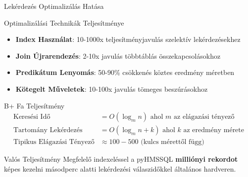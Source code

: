 \documentclass[aspectratio=169]{beamer}
\begin{document}
\begin{frame}{Lekérdezés Optimalizálás Hatása}
\begin{block}{Optimalizálási Technikák Teljesítménye}
\begin{itemize}
    \item \textbf{Index Használat}: 10-1000x teljesítményjavulás szelektív lekérdezésekhez
    \item \textbf{Join Újrarendezés}: 2-10x javulás többtáblás összekapcsolásokhoz
    \item \textbf{Predikátum Lenyomás}: 50-90\% csökkenés köztes eredmény méretben
    \item \textbf{Kötegelt Műveletek}: 10-100x javulás tömeges beszúrásokhoz
\end{itemize}
\end{block}

\begin{block}{B+ Fa Teljesítmény}
\begin{align}
\text{Keresési Idő} &= O(\log_m n) \text{ ahol } m \text{ az elágazási tényező} \\
\text{Tartomány Lekérdezés} &= O(\log_m n + k) \text{ ahol } k \text{ az eredmény mérete} \\
\text{Tipikus Elágazási Tényező} &\approx 100-500 \text{ (kulcs mérettől függ)}
\end{align}
\end{block}

\begin{alertblock}{Valós Teljesítmény}
Megfelelő indexeléssel a pyHMSSQL \textbf{milliónyi rekordot} képes kezelni másodperc alatti lekérdezési válaszidőkkel általános hardveren.
\end{alertblock}
\end{frame}
\end{document}
